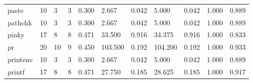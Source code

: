 \begin{longtable}{lp{1.2cm}p{1.2cm}p{1.2cm}p{1.2cm}p{1.2cm}p{1.2cm}p{1.2cm}p{1.2cm}p{1.2cm}p{1.2cm}}
paste     &                           10 &                  3 &                                 3 &                                      0.300 &                                  2.667 &                                        0.042 &                             5.000 &                                   0.042 &                              1.000 &                                              0.889 \\
pathchk   &                           10 &                  3 &                                 3 &                                      0.300 &                                  2.667 &                                        0.042 &                             5.000 &                                   0.042 &                              1.000 &                                              0.889 \\
pinky     &                           17 &                  8 &                                 8 &                                      0.471 &                                 33.500 &                                        0.916 &                            34.375 &                                   0.916 &                              1.000 &                                              0.833 \\
pr        &                           20 &                 10 &                                 9 &                                      0.450 &                                103.500 &                                        0.192 &                           104.200 &                                   0.192 &                              1.000 &                                              0.933 \\
printenv  &                           10 &                  3 &                                 3 &                                      0.300 &                                  2.667 &                                        0.042 &                             5.000 &                                   0.042 &                              1.000 &                                              0.889 \\
printf    &                           17 &                  8 &                                 8 &                                      0.471 &                                 27.750 &                                        0.185 &                            28.625 &                                   0.185 &                              1.000 &                                              0.917 \\

\end{longtable}
